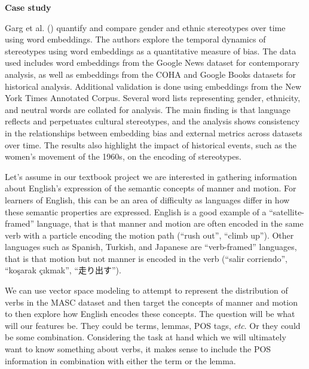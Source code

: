 \documentclass[
  letterpaper,
  DIV=11,
  numbers=noendperiod]{scrreprt}
\theoremstyle{definition}
\theoremstyle{remark}
\begin{document}
\begin{tcolorbox}[enhanced jigsaw, leftrule=.75mm, colframe=quarto-callout-color-frame, colback=white, rightrule=.15mm, opacityback=0, arc=.35mm, breakable, bottomrule=.15mm, left=2mm, toprule=.15mm]

\textbf{ Case study}

Garg et al. () quantify and compare gender
and ethnic stereotypes over time using word embeddings. The authors
explore the temporal dynamics of stereotypes using word embeddings as a
quantitative measure of bias. The data used includes word embeddings
from the Google News dataset for contemporary analysis, as well as
embeddings from the COHA and Google Books datasets for historical
analysis. Additional validation is done using embeddings from the New
York Times Annotated Corpus. Several word lists representing gender,
ethnicity, and neutral words are collated for analysis. The main finding
is that language reflects and perpetuates cultural stereotypes, and the
analysis shows consistency in the relationships between embedding bias
and external metrics across datasets over time. The results also
highlight the impact of historical events, such as the women's movement
of the 1960s, on the encoding of stereotypes.

\end{tcolorbox}

Let's assume in our textbook project we are interested in gathering
information about English's expression of the semantic concepts of
manner and motion. For learners of English, this can be an area of
difficulty as languages differ in how these semantic properties are
expressed. English is a good example of a ``satellite-framed'' language,
that is that manner and motion are often encoded in the same verb with a
particle encoding the motion path (``rush out'', ``climb up''). Other
languages such as Spanish, Turkish, and Japanese are ``verb-framed''
languages, that is that motion but not manner is encoded in the verb
(``salir corriendo'', ``koşarak çıkmak'', ``走り出す'').

We can use vector space modeling to attempt to represent the
distribution of verbs in the MASC dataset and then target the concepts
of manner and motion to then explore how English encodes these concepts.
The question will be what will our features be. They could be terms,
lemmas, POS tags, \emph{etc}. Or they could be some combination.
Considering the task at hand which we will ultimately want to know
something about verbs, it makes sense to include the POS information in
combination with either the term or the lemma.
\end{document}
